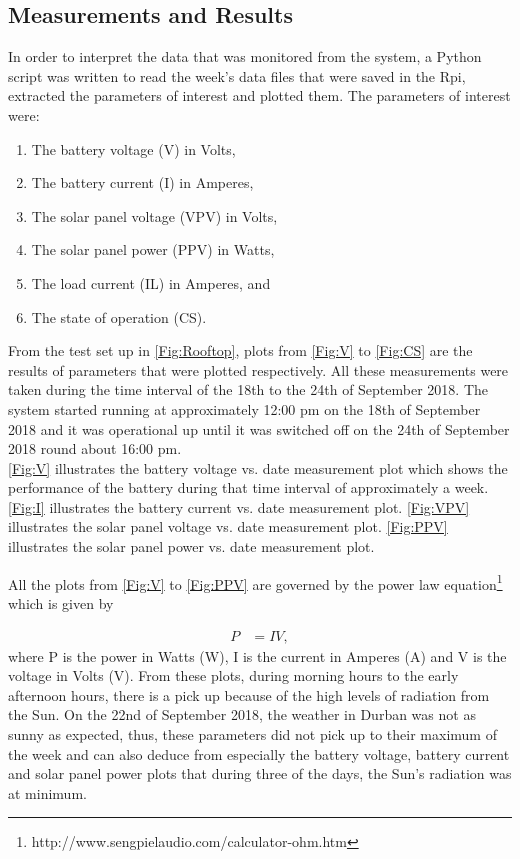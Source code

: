 \documentclass[12pt,a4paper]{report}
\begin{document}
\newpage
\subsection{Measurements and Results}

In order to interpret the data that was monitored from the system, a Python script was written to read the week's data files that were saved in the Rpi, extracted the parameters of interest and plotted them. The parameters of interest were:

\begin{enumerate}
	\item The battery voltage (V) in Volts,
	\item The battery current (I) in Amperes,
	\item The solar panel voltage (VPV) in Volts,
	\item The solar panel power (PPV) in Watts,
	\item The load current (IL) in Amperes, and
	\item The state of operation (CS).
\end{enumerate}

From the test set up in \autoref{Fig:Rooftop}, plots from \autoref{Fig:V} to \autoref{Fig:CS} are the results of parameters that were plotted respectively. All these measurements were taken during the time interval of the 18th to the 24th of September 2018. The system started running at approximately 12:00 pm on the 18th of September 2018 and it was operational up until it was switched off on the 24th of September 2018 round about 16:00 pm.\\
\autoref{Fig:V} illustrates the battery voltage vs. date measurement plot which shows the performance of the battery during that time interval of approximately a week.
\autoref{Fig:I} illustrates the battery current vs. date measurement plot.
\autoref{Fig:VPV} illustrates the solar panel voltage vs. date measurement plot.
\autoref{Fig:PPV} illustrates the solar panel power vs. date measurement plot.

All the plots from \autoref{Fig:V} to \autoref{Fig:PPV} are governed by the power law equation\footnote{http://www.sengpielaudio.com/calculator-ohm.htm} which is given by 

\begin{equation} \label{Power}
	\begin{split}
	P & = IV,
	\end{split}
\end{equation}
where P is the power in Watts (W), I is the current in Amperes (A) and V is the voltage in Volts (V). From these plots, during morning hours to the early afternoon hours, there is a pick up because of the high levels of radiation from the Sun. On the 22nd of September 2018, the weather in Durban was not as sunny as expected, thus, these parameters did not pick up to their maximum of the week and can also deduce from especially the battery voltage, battery current and solar panel power plots that during three of the days, the Sun's radiation was at minimum. \\
\end{document}
